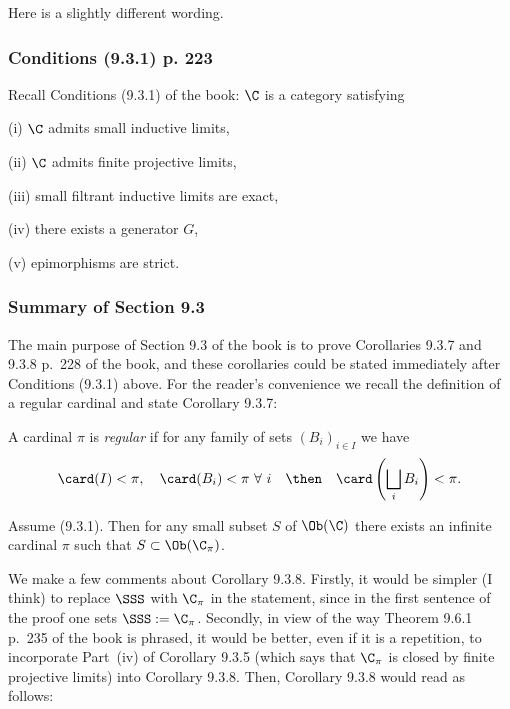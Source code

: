 \documentclass[12pt]{article}
\theoremstyle{remark}
\theoremstyle{definition}
\begin{document}
Here is a slightly different wording. 

\subsubsection{Conditions (9.3.1) p. 223}

Recall Conditions (9.3.1) of the book: $\C$ is a category satisfying  

(i) $\C$ admits small inductive limits,

(ii) $\C$ admits finite projective limits,

(iii) small filtrant inductive limits are exact, 

(iv) there exists a generator $G$,

(v) epimorphisms are strict.

\subsubsection{Summary of Section 9.3}

The main purpose of Section 9.3 of the book is to prove Corollaries 9.3.7 and 9.3.8 p.~228 of the book, and these corollaries could be stated immediately after Conditions (9.3.1) above. For the reader's convenience we recall the definition of a regular cardinal and state Corollary 9.3.7:

\begin{df} 
A cardinal $\pi$ is \emph{regular} if for any family of sets $(B_i)_{i\in I}$ we have 
$$
\card(I)<\pi,\quad\card(B_i)<\pi\ \forall\ i\quad\then\quad\card\left(\bigsqcup_iB_i\right)<\pi.
$$
\end{df}

\begin{cor}[Corollary 9.3.7 p. 228]
Assume (9.3.1). Then for any small subset $S$ of $\Ob(\C)$ there exists an infinite cardinal $\pi$ such that $S\subset\Ob(\C_\pi)$.
\end{cor}

We make a few comments about Corollary 9.3.8. Firstly, it would be simpler (I think) to replace $\SSS$ with $\C_\pi$ in the statement, since in the first sentence of the proof one sets $\SSS:=\C_\pi$. Secondly, in view of the way Theorem 9.6.1 p.~235 of the book is phrased, it would be better, even if it is a repetition, to incorporate Part~(iv) of Corollary 9.3.5 (which says that $\C_\pi$ is closed by finite projective limits) into Corollary 9.3.8. Then, Corollary 9.3.8 would read as follows:
\end{document}

